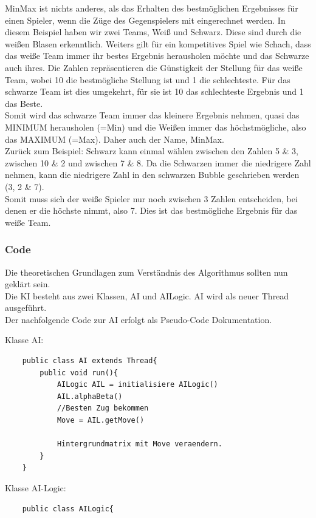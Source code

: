 \documentclass[12pt,a4paper]{article}
\begin{document}
{MinMax ist nichts anderes, als das Erhalten des bestmöglichen Ergebnisses für einen Spieler, wenn die Züge des Gegenspielers mit eingerechnet werden. In diesem Beispiel haben wir zwei Teams, Weiß und Schwarz. Diese sind durch die weißen Blasen erkenntlich. Weiters gilt für ein kompetitives Spiel wie Schach, dass das weiße Team immer ihr bestes Ergebnis herausholen möchte und das Schwarze auch ihres. Die Zahlen repräsentieren die Günstigkeit der Stellung für das weiße Team, wobei 10 die bestmögliche Stellung ist und 1 die schlechteste. Für das schwarze Team ist dies umgekehrt, für sie ist 10 das schlechteste Ergebnis und 1 das Beste. \\
Somit wird das schwarze Team immer das kleinere Ergebnis nehmen, quasi das MINIMUM herausholen (=Min) und die Weißen immer das höchstmögliche, also das MAXIMUM (=Max). Daher auch der Name, MinMax. \\
Zurück zum Beispiel: Schwarz kann einmal wählen zwischen den Zahlen 5 \& 3, zwischen 10 \& 2 und zwischen 7 \& 8. Da die Schwarzen immer die niedrigere Zahl nehmen, kann die niedrigere Zahl in den schwarzen Bubble geschrieben werden (3, 2 \& 7). \\
Somit muss sich der weiße Spieler nur noch zwischen 3 Zahlen entscheiden, bei denen er die höchste nimmt, also 7. Dies ist das bestmögliche Ergebnis für das weiße Team.

\subsubsection{Code}
\label{SUBSUBSEC:AICODE}

Die theoretischen Grundlagen zum Verständnis des Algorithmus sollten nun geklärt sein.\\
Die KI besteht aus zwei Klassen, AI und AILogic. AI wird als neuer Thread ausgeführt. \\
Der nachfolgende Code zur AI erfolgt als Pseudo-Code Dokumentation.


Klasse AI:

\lstset{language=Java}
\begin{lstlisting}
	public class AI extends Thread{
		public void run(){
			AILogic AIL = initialisiere AILogic()
			AIL.alphaBeta()
			//Besten Zug bekommen
			Move = AIL.getMove()
			
			Hintergrundmatrix mit Move veraendern.
		}
	}	
\end{lstlisting}

Klasse AI-Logic:
\lstset{language=Java}
\begin{lstlisting}
	public class AILogic{
	

\end{lstlisting}}
\end{document}
